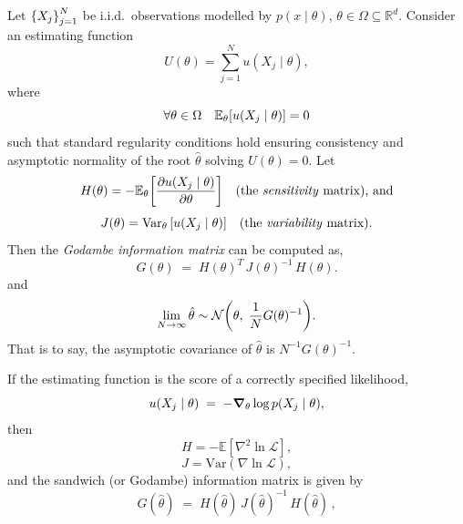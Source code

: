             \begin{theorem}
            \noproofref
            \label{thm:godambe-information}
                Let \(\qty{X_j}_{j=1}^N\) be i.i.d.\ observations modelled by \(p(x\mid\theta)\), \(\theta\in\Omega\subseteq\mathbb{R}^{d}\).  Consider an estimating function
                \[
                    U(\theta) =\sum_{j=1}^{N}u(X_{j}\mid\theta),
                \]
                where 
                \[
                    \forall\theta\in\Omega\quad\mathbb{E}_{\theta}\qty[u(X_{j}\mid\theta)]=0
                \]
                such that standard regularity conditions hold ensuring consistency and asymptotic normality of the root \(\hat\theta\) solving \(U(\theta)=0\).  Let
                \[
                    H(\theta) =-\mathbb{E}_{\theta}\qty[\pdv{u(X_{j}\mid\theta)}{\theta}] \quad\text{(the \emph{sensitivity} matrix), and}
                \]
                \[
                    J(\theta) =\operatorname{Var}_{\theta}\qty[u(X_{j}\mid\theta)] \quad\text{(the \emph{variability} matrix).}
                \]
                Then the \emph{Godambe information matrix} can be computed as,
                \[
                    G(\theta) \;=\; H(\theta)^{T}\,J(\theta)^{-1}\,H(\theta).
                \]
                and
                \[
                \lim_{N\to\infty}\hat\theta \sim \mathcal{N}\qty(\theta,\;\frac1NG(\theta)^{-1}).
                \]
                That is to say, the asymptotic covariance of \(\hat\theta\) is \(N^{-1}G(\theta)^{-1}\).
            \end{theorem}
            \begin{theorem}
            \noproofref
            If the estimating function is the score of a correctly specified likelihood,
            \[
                u(X_j\mid\theta)\;=\;-\grad_{\theta}\log p(X_j\mid\theta),
            \]
            then
            \[
                H = -\mathbb{E}[\nabla^2 \ln \mathcal{L}],
            \]
            \[
                J = \mathrm{Var}(\nabla \ln \mathcal{L}),
            \]
            and the sandwich (or Godambe) information matrix is given by
            \[
                G(\hat{\theta}) \;=\; H(\hat{\theta})\, J(\hat{\theta})^{-1}\, H(\hat{\theta}) \,,
            \]
            \end{theorem}
            
